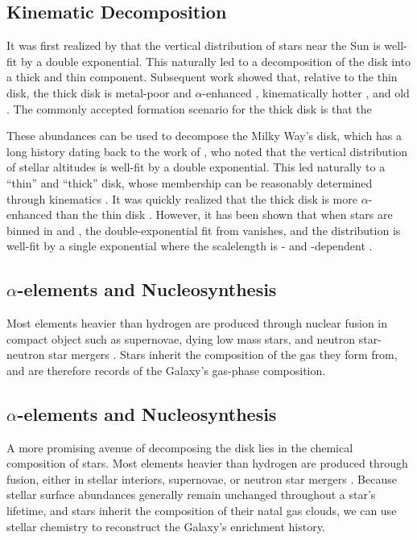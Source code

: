 \subsection{Kinematic Decomposition}\label{intro:kin_decomp}
It was first realized by \citet{1983MNRAS.202.1025G} that the vertical distribution of stars near the Sun is well-fit by a double exponential. This naturally led to a decomposition of the disk into a thick and thin component. Subsequent work showed that, relative to the thin disk, the thick disk is metal-poor and $\alpha$-enhanced \citep{1998A&A...338..161F}, kinematically hotter \citep{2000AJ....119.2843C}, and old \citep{2005A&A...433..185B}. The commonly accepted formation scenario for the thick disk is that the 

These abundances can be used to decompose the Milky Way's disk, which has a long history dating back to the work of \citet{1983MNRAS.202.1025G}, who noted that the vertical distribution of stellar altitudes is well-fit by a double exponential. This led naturally to a ``thin'' and ``thick'' disk, whose membership can be reasonably determined through kinematics \citep[e.g.][]{2003A&A...410..527B}. It was quickly realized that the thick disk is more $\alpha$-enhanced than the thin disk \citep{1996ASPC...92..307G,1998A&A...338..161F}. However, it has been shown that when stars are binned in \FeH{} and \alphaFe{}, the double-exponential fit from \citet{1983MNRAS.202.1025G} vanishes, and the distribution is well-fit by a single exponential where the scalelength is \FeH{}- and \alphaFe{}-dependent \citep{2012ApJ...751..131B}.

\subsection{\texorpdfstring{$\alpha$}{α}-elements and Nucleosynthesis}\label{intro:ssec:alpha_elem_chem}
Most elements heavier than hydrogen are produced through nuclear fusion in compact object such as supernovae, dying low mass stars, and neutron star-neutron star mergers \citep[e.g.][]{2023A&ARv..31....1A}. Stars inherit the composition of the gas they form from, and are therefore records of the Galaxy's gas-phase composition. 

\subsection{\texorpdfstring{$\alpha$}{α}-elements and Nucleosynthesis}
A more promising avenue of decomposing the disk lies in the chemical composition of stars. Most elements heavier than hydrogen are produced through fusion, either in stellar interiors, supernovae, or neutron star mergers \citep[e.g.][]{2023A&ARv..31....1A}. Because stellar surface abundances generally remain unchanged throughout a star's lifetime, and stars inherit the composition of their natal gas clouds, we can use stellar chemistry to reconstruct the Galaxy's enrichment history.

